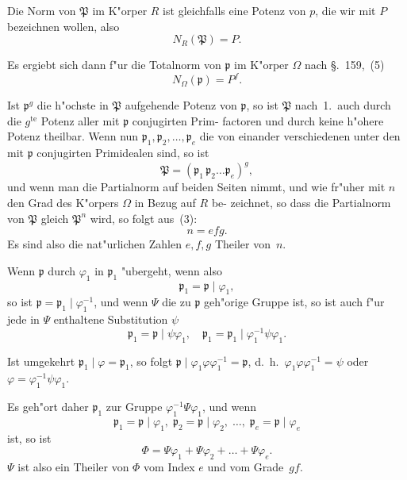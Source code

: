 \documentclass[12pt,a4paper]{article}
\theoremstyle{weber}
\begin{document}
Die Norm von $\mathfrak{P}$ im K"orper $R$ ist gleichfalls eine Potenz
von $p$, die wir mit $P$ bezeichnen wollen, also
\begin{equation}\label{eq:s160-4}
N_R(\mathfrak{P}) = P.
\end{equation}

Es ergiebt sich dann f"ur die Totalnorm von $\mathfrak{p}$ im K"orper $\varOmega$
nach \S.~159,~(5)
\begin{equation}\label{eq:s160-5}
N_\varOmega(\mathfrak{p}) = P^f.
\end{equation}

Ist $\mathfrak{p}^g$ die h"ochste in $\mathfrak{P}$ aufgehende Potenz von $\mathfrak{p}$, so ist $\mathfrak{P}$
nach~1.\ auch durch die $g^{\mathrm{te}}$ Potenz aller mit $\mathfrak{p}$ conjugirten Prim-
factoren und durch keine h"ohere Potenz theilbar. Wenn nun
$\mathfrak{p}_1, \mathfrak{p}_2, \dots, \mathfrak{p}_e$ die von einander verschiedenen unter den mit
$\mathfrak{p}$ conjugirten Primidealen sind, so ist
\begin{equation}\label{eq:s160-6}
\mathfrak{P} = (\mathfrak{p}_1\,\mathfrak{p}_2\dots\mathfrak{p}_e)^g,
\end{equation}
und wenn man die Partialnorm auf beiden Seiten nimmt, und
wie fr"uher mit $n$ den Grad des K"orpers $\varOmega$ in Bezug auf $R$ be-
zeichnet, so dass die Partialnorm von $\mathfrak{P}$ gleich $\mathfrak{P}^n$ wird, so folgt
aus~(3):
\begin{equation}\label{eq:s160-7}
n = efg.
\end{equation}
Es sind also die nat"urlichen Zahlen $e, f, g$ Theiler von~$n$.

Wenn $\mathfrak{p}$ durch $\varphi_1$ in $\mathfrak{p}_1$ "ubergeht, wenn also
\[
\mathfrak{p}_1 = \mathfrak{p} \mid \varphi_1,
\]
so ist $\mathfrak{p} = \mathfrak{p}_1 \mid \varphi_1^{-1}$, und wenn $\varPsi$ die zu $\mathfrak{p}$ geh"orige Gruppe ist,
so ist auch f"ur jede in $\varPsi$ enthaltene Substitution $\psi$
\[
\mathfrak{p}_1 = \mathfrak{p} \mid \psi\varphi_1, \quad \mathfrak{p}_1 = \mathfrak{p}_1 \mid \varphi_1^{-1}\psi\varphi_1.
\]

Ist umgekehrt $\mathfrak{p}_1 \mid \varphi = \mathfrak{p}_1$, so folgt $\mathfrak{p} \mid \varphi_1\varphi\varphi_1^{-1} = \mathfrak{p}$, d.~h.\
$\varphi_1\varphi\varphi_1^{-1} = \psi$ oder $\varphi = \varphi_1^{-1}\psi\varphi_1$.

Es geh"ort daher $\mathfrak{p}_1$ zur Gruppe $\varphi_1^{-1}\varPsi\varphi_1$, und wenn
\[
\mathfrak{p}_1 = \mathfrak{p} \mid \varphi_1, \; \mathfrak{p}_2 = \mathfrak{p} \mid \varphi_2, \; \dots, \; \mathfrak{p}_e = \mathfrak{p} \mid \varphi_e
\]
ist, so ist
\begin{equation}\label{eq:s160-8}
\varPhi = \varPsi\varphi_1 + \varPsi\varphi_2 + \dots + \varPsi\varphi_e.
\end{equation}
$\varPsi$ ist also ein Theiler von $\varPhi$ vom Index $e$ und vom Grade~$gf$.
\end{document}
